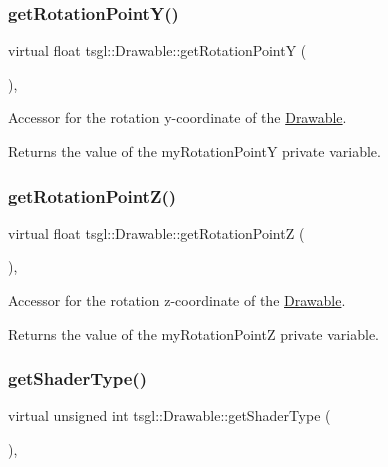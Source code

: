 \subsubsection{\texorpdfstring{get\+Rotation\+Point\+Y()}{getRotationPointY()}}
{\footnotesize\ttfamily virtual float tsgl\+::\+Drawable\+::get\+Rotation\+PointY (\begin{DoxyParamCaption}{ }\end{DoxyParamCaption})\hspace{0.3cm}{\ttfamily [inline]}, {\ttfamily [virtual]}}



Accessor for the rotation y-\/coordinate of the \hyperlink{classtsgl_1_1_drawable}{Drawable}. 

Returns the value of the my\+Rotation\+PointY private variable. \mbox{\label{classtsgl_1_1_drawable_a755bfd7fc04feb04f1932c0e0886c8e5}} 
\subsubsection{\texorpdfstring{get\+Rotation\+Point\+Z()}{getRotationPointZ()}}
{\footnotesize\ttfamily virtual float tsgl\+::\+Drawable\+::get\+Rotation\+PointZ (\begin{DoxyParamCaption}{ }\end{DoxyParamCaption})\hspace{0.3cm}{\ttfamily [inline]}, {\ttfamily [virtual]}}



Accessor for the rotation z-\/coordinate of the \hyperlink{classtsgl_1_1_drawable}{Drawable}. 

Returns the value of the my\+Rotation\+PointZ private variable. \mbox{\label{classtsgl_1_1_drawable_a2985b1872024a4c0469e9953c60db728}} 
\subsubsection{\texorpdfstring{get\+Shader\+Type()}{getShaderType()}}
{\footnotesize\ttfamily virtual unsigned int tsgl\+::\+Drawable\+::get\+Shader\+Type (\begin{DoxyParamCaption}{ }\end{DoxyParamCaption})\hspace{0.3cm}{\ttfamily [inline]}, {\ttfamily [virtual]}}



